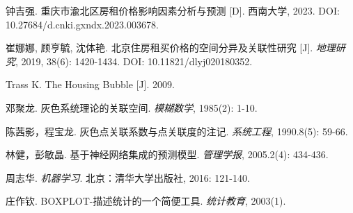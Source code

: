 \documentclass[12pt]{article}
\begin{document}
\begin{CJK}{UTF8}{gbsn}
\begin{thebibliography}{99}
		 钟吉强. 重庆市渝北区房租价格影响因素分析与预测 [D]. 西南大学, 2023. DOI: 10.27684/d.cnki.gxndx.2023.003678.
		
		 崔娜娜, 顾亨毓, 沈体艳. 北京住房租买价格的空间分异及关联性研究 [J]. \textit{地理研究}, 2019, 38(6): 1420-1434. DOI: 10.11821/dlyj020180352.
		
		 Trass K. The Housing Bubble [J]. 2009.
		
		 邓聚龙. 灰色系统理论的关联空间. \textit{模糊数学}, 1985(2): 1-10.
		
		 陈茜影，程宝龙. 灰色点关联系数与点关联度的注记. \textit{系统工程}, 1990.8(5): 59-66.
		
		 林健，彭敏晶. 基于神经网络集成的预测模型. \textit{管理学报}, 2005.2(4): 434-436.
		
		 周志华. \textit{机器学习}. 北京：清华大学出版社, 2016: 121-140.
		
		 庄作钦. BOXPLOT-描述统计的一个简便工具. \textit{统计教育}, 2003(1).
		
	\end{thebibliography}
	
	
	
	
\end{CJK}
\end{document}
